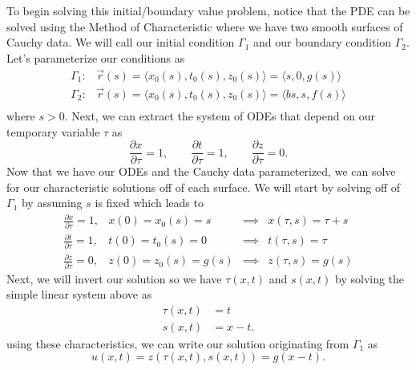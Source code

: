 \documentclass[a4paper,12pt]{article}
\begin{document}
\begin{enumerate}[label = \textbf{(\alph*)}]
        To begin solving this initial/boundary value problem, notice that the PDE can be solved using the Method of Characteristic where we have two smooth surfaces of Cauchy data. We will call our initial condition $ \Gamma_1 $ and our boundary condition $ \Gamma_2 $. Let's parameterize our conditions as
        \[
            \begin{array}{rl}
                \Gamma_1: & \vec{r}(s) = \langle x_0(s), t_0(s), z_0(s) \rangle = \langle s, 0, g(s)  \rangle \\
                \Gamma_2: & \vec{r}(s) = \langle x_0(s), t_0(s), z_0(s) \rangle = \langle bs, s, f(s)  \rangle \\
            \end{array}
        \]
        where $ s > 0 $. Next, we can extract the system of ODEs that depend on our temporary variable $ \tau $ as
        \[
            \frac{\partial x}{\partial \tau} = 1, \qquad \frac{\partial t}{\partial \tau} = 1, \qquad \frac{\partial z}{\partial \tau} = 0.
        \]
        Now that we have our ODEs and the Cauchy data parameterized, we can solve for our characteristic solutions off of each surface. We will start by solving off of $ \Gamma_1 $ by assuming $ s $ is fixed which leads to
        \[
            \begin{array}{rccl}
                \frac{\partial x}{\partial \tau} = 1, & x(0) = x_0(s) = s & \implies & x(\tau, s) = \tau + s \\
                \frac{\partial t}{\partial \tau} = 1, & t(0) = t_0(s) = 0 & \implies & t(\tau, s) = \tau \\
                \frac{\partial z}{\partial \tau} = 0, & z(0) = z_0(s) = g(s) & \implies & z(\tau, s) = g(s)
            \end{array}
        \]
        Next, we will invert our solution so we have $ \tau(x,t) $ and $ s(x,t) $  by solving the simple linear system above as
        \begin{align*}
            \tau(x,t) &= t \\
            s(x,t) &= x - t.
        \end{align*}
        using these characteristics, we can write our solution originating from $ \Gamma_1 $ as
        \begin{equation}
            u(x,t) = z(\tau(x,t), s(x,t)) = g(x - t). \label{soln:gamma1}
        \end{equation}
    

\end{enumerate}
\end{document}
